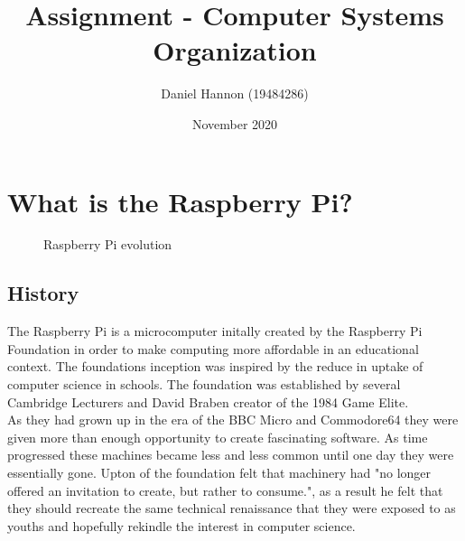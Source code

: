 \documentclass{article}
\title{Assignment - Computer Systems Organization}
\author{Daniel Hannon (19484286)}
\date{November 2020}
\begin{document}
	\maketitle
	\section{What is the Raspberry Pi?}
	\begin{figure}[h!]
		\centering
		\qquad
		\caption{Raspberry Pi evolution}%
		\label{fig:example}%
	\end{figure}
	\subsection{History}
	The Raspberry Pi is a microcomputer initally created by the Raspberry Pi Foundation in order to make computing more affordable in an educational context. The foundations inception was inspired by the reduce in uptake of computer science in schools. The foundation was established by several Cambridge Lecturers and David Braben creator of the 1984 Game Elite. \\As they had grown up in the era of the BBC Micro and Commodore64 they were given more than enough opportunity to create fascinating software. As time progressed these machines became less and less common until one day they were essentially gone. Upton of the foundation felt that machinery had "no longer offered an invitation to create, but rather to consume.", as a result he felt that they should recreate the same technical renaissance that they were exposed to as youths and hopefully rekindle the interest in computer science.\citep{heath}
\end{document}

